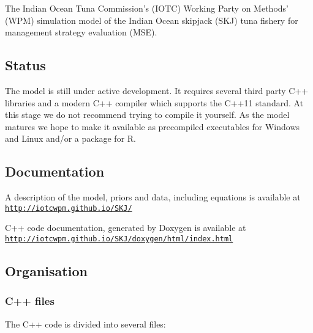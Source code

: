 The Indian Ocean Tuna Commission's (I\-O\-T\-C) Working Party on Methods' (W\-P\-M) simulation model of the Indian Ocean skipjack (S\-K\-J) tuna fishery for management strategy evaluation (M\-S\-E).

\subsection*{Status}

The model is still under active development. It requires several third party C++ libraries and a modern C++ compiler which supports the C++11 standard. At this stage we do not recommend trying to compile it yourself. As the model matures we hope to make it available as precompiled executables for Windows and Linux and/or a package for R.

\subsection*{Documentation}

A description of the model, priors and data, including equations is available at \href{http://iotcwpm.github.io/SKJ/}{\tt http\-://iotcwpm.\-github.\-io/\-S\-K\-J/}

C++ code documentation, generated by Doxygen is available at \href{http://iotcwpm.github.io/SKJ/doxygen/html/index.html}{\tt http\-://iotcwpm.\-github.\-io/\-S\-K\-J/doxygen/html/index.\-html}

\subsection*{Organisation}

\subsubsection*{C++ files}

The C++ code is divided into several files\-:


